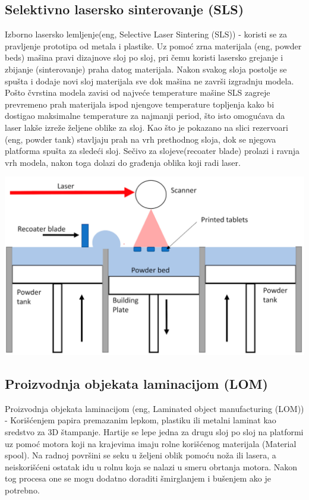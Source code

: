 \documentclass[a4paper]{article}
\begin{document}
{\subsection{Selektivno lasersko sinterovanje (SLS)}
\label{subsec:podnaslov4}
Izborno lasersko lemljenje(eng, Selective Laser Sintering (SLS)) - koristi se za pravljenje prototipa od metala i plastike. Uz pomoć zrna materijala (eng, powder beds) mašina pravi dizajnove sloj po sloj, pri čemu koristi lasersko grejanje i zbijanje (sinterovanje) praha datog materijala. 
\bigbreak Nakon svakog sloja postolje se spušta i dodaje novi sloj materijala sve dok mašina ne završi izgradnju modela. Pošto čvrstina modela zavisi od najveće temperature mašine SLS zagreje prevremeno prah materijala ispod njengove temperature topljenja kako bi dostigao maksimalne temperature za najmanji period, što isto omogućava da laser lakše izreže željene oblike za sloj. 
\bigbreak Kao što je pokazano na slici rezervoari (eng, powder tank) stavljaju prah na vrh prethodnog sloja, dok se njegova platforma spušta za sledeći sloj.
\bigbreak Sečivo za slojeve(recoater blade) prolazi i ravnja vrh modela, nakon toga dolazi do građenja oblika koji radi laser. 
\begin{center}
\includegraphics[width=.5\textwidth ]{Tehnikeslike/Sls.png}
\end{center}
\newpage
\subsection{Proizvodnja objekata laminacijom (LOM)}
\label{subsec:podnaslov5}
Proizvodnja objekata laminacijom (eng, Laminated object manufacturing (LOM)) - Korišćenjem papira premazanim lepkom, plastiku ili metalni laminat kao sredstvo za 3D štampanje. 
\bigbreak Hartije se lepe jedna za drugu sloj po sloj na platformi uz pomoć motora koji na krajevima imaju rolne korišćenog materijala (Material spool).
\bigbreak Na radnoj površini se seku u željeni oblik pomoću noža ili lasera, a neiskorišćeni ostatak idu u rolnu koja se nalazi u smeru obrtanja motora.
\bigbreak Nakon tog procesa one se mogu dodatno doraditi šmirglanjem i bušenjem ako je potrebno.

}
\end{document}
